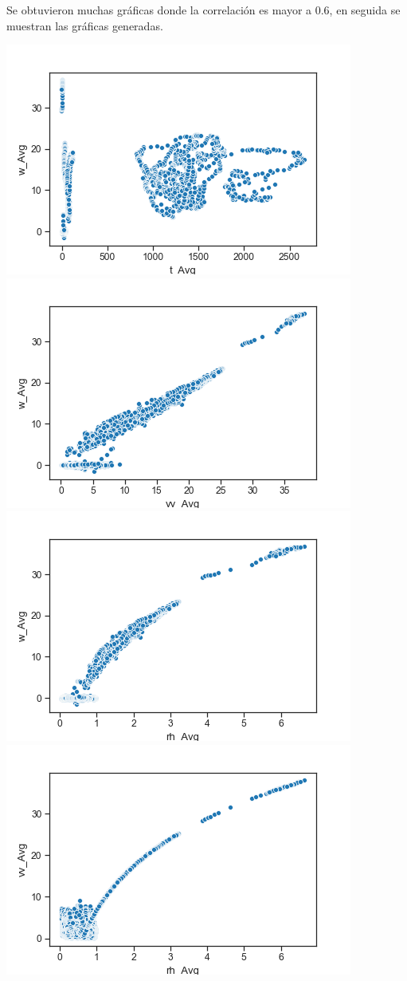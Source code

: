 \documentclass{article}
\begin{document}
Se obtuvieron muchas gráficas donde la correlación es mayor a 0.6, en seguida se muestran las gráficas generadas.

\begin{center}
    \includegraphics[scale = 0.5]{corr1.png}
    \includegraphics[scale = 0.5]{corr2.png}
    \includegraphics[scale = 0.5]{corr3.png}
    \includegraphics[scale = 0.5]{corr4.png}

\end{center}
\end{document}
